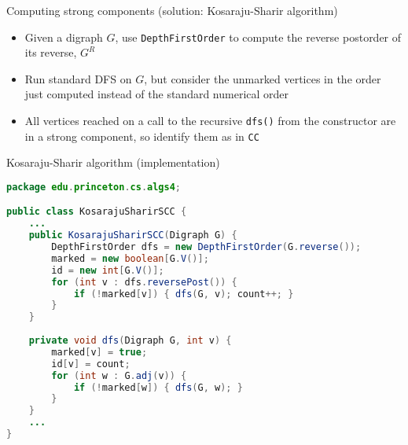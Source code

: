 \documentclass[8pt,a4paper,compress]{beamer}
\begin{document}
\begin{frame}[fragile]
Computing strong components (solution: Kosaraju-Sharir algorithm)
\begin{itemize}
\item Given a digraph $G$, use \lstinline{DepthFirstOrder} to compute the reverse postorder of its reverse, $G^R$

\item Run standard DFS on $G$, but consider the unmarked vertices in the order just computed instead of the standard numerical order

\item All vertices reached on a call to the recursive \lstinline{dfs()} from the constructor are in a strong component, so identify them as in \lstinline{CC}
\end{itemize}

\bigskip

Kosaraju-Sharir algorithm (implementation)
\begin{lstlisting}[language=Java]
package edu.princeton.cs.algs4;

public class KosarajuSharirSCC {
    ...
    public KosarajuSharirSCC(Digraph G) {
        DepthFirstOrder dfs = new DepthFirstOrder(G.reverse());
        marked = new boolean[G.V()];
        id = new int[G.V()];
        for (int v : dfs.reversePost()) {
            if (!marked[v]) { dfs(G, v); count++; }
        }
    }
    
    private void dfs(Digraph G, int v) { 
        marked[v] = true;
        id[v] = count;
        for (int w : G.adj(v)) {
            if (!marked[w]) { dfs(G, w); }
        }
    }
    ...
}
\end{lstlisting}
\end{frame}
\end{document}
